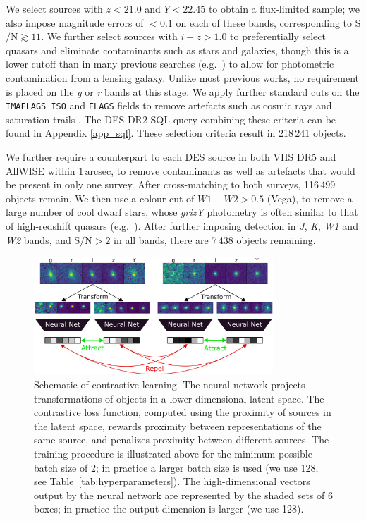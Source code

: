 \documentclass[fleqn,usenatbib]{mnras}
\begin{document}
We select sources with $\mathit{z} < 21.0$ and $\mathit{Y}<22.45$ to obtain a flux-limited sample; we also impose magnitude errors of $<0.1$ on each of these bands, corresponding to S$/$N$\gtrsim11$.
We further select sources with $\mathit{i}-\mathit{z}>1.0$ to preferentially select quasars and eliminate contaminants such as stars and galaxies, though this is a lower cutoff than in many previous searches (e.g.\ \citealt{reed15, reed17, wang19, Banados2016, banados23}) to allow for photometric contamination from a lensing galaxy.
Unlike most previous works, no requirement is placed on the \textit{g} or \textit{r} bands at this stage.
We apply further standard cuts on the \texttt{IMAFLAGS\_ISO} and \texttt{FLAGS} fields to remove artefacts such as cosmic rays and saturation trails \citep{desdr2}.
The DES DR2 SQL query combining these criteria can be found in Appendix \ref{app_sql}.
These selection criteria result in 218\,241 objects.

We further require a counterpart to each DES source in both VHS DR5 \citep{vhsdr5} and AllWISE \citep{allwise} within $1\,\text{arcsec}$, to remove contaminants as well as artefacts that would be present in only one survey. 
After cross-matching to both surveys, 116\,499 objects remain.
We then use a colour cut of $\mathit{W1}-\mathit{W2}>0.5$ (Vega), to remove a large number of cool dwarf stars, whose \textit{grizY} photometry is often similar to that of high-redshift quasars (e.g.\ \citealt{carnall15}).
After further imposing detection in \textit{J}, \textit{K}, \textit{W1} and \textit{W2} bands, and S$/\text{N}>2$ in all bands, there are 7\,438 objects remaining.

\begin{figure}
\includegraphics[width=0.8\textwidth]{figs/contrastive.png}
\caption{Schematic of contrastive learning.
The neural network projects transformations of objects in a lower-dimensional latent space.
The contrastive loss function, computed using the proximity of sources in the latent space, rewards proximity between representations of the same source, and penalizes proximity between different sources.
The training procedure is illustrated above for the minimum possible batch size of 2; in practice a larger batch size is used (we use 128, see Table~\ref{tab:hyperparameters}).
The high-dimensional vectors output by the neural network are represented by the shaded sets of 6 boxes; in practice the output dimension is larger (we use 128).
}
\label{fig:contrastive}
\end{figure}
\end{document}
